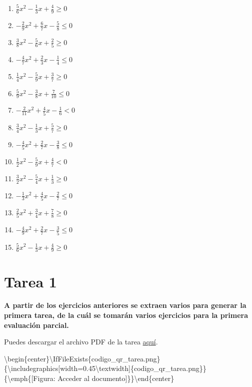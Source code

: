 \documentclass[12pt]{article}
\providecommand{\tightlist}{\setlength{\itemsep}{0pt}\setlength{\parskip}{0pt}}
\begin{document}
\begin{enumerate}
\def\labelenumi{\arabic{enumi}.}
\tightlist
\item
  \(\frac{5}{6}x^2 - \frac{1}{3}x + \frac{4}{9} \geq 0\)
\item
  \(-\frac{2}{9}x^2 + \frac{6}{7}x - \frac{5}{8} \leq 0\)
\item
  \(\frac{3}{8}x^2 - \frac{5}{6}x + \frac{2}{5} \geq 0\)
\item
  \(-\frac{4}{7}x^2 + \frac{2}{3}x - \frac{1}{4} \leq 0\)
\item
  \(\frac{1}{4}x^2 - \frac{5}{9}x + \frac{3}{7} \geq 0\)
\item
  \(\frac{5}{9}x^2 - \frac{3}{8}x + \frac{7}{10} \leq 0\)
\item
  \(-\frac{2}{11}x^2 + \frac{4}{5}x - \frac{1}{6} < 0\)
\item
  \(\frac{3}{4}x^2 - \frac{1}{3}x + \frac{5}{7} \geq 0\)
\item
  \(-\frac{4}{5}x^2 + \frac{2}{7}x - \frac{3}{8} \leq 0\)
\item
  \(\frac{1}{2}x^2 - \frac{5}{9}x + \frac{4}{7} < 0\)
\item
  \(\frac{3}{2}x^2 - \frac{5}{4}x + \frac{1}{3} \geq 0\)
\item
  \(-\frac{1}{3}x^2 + \frac{4}{5}x - \frac{2}{7} \leq 0\)
\item
  \(\frac{2}{5}x^2 + \frac{3}{4}x + \frac{7}{8} \geq 0\)
\item
  \(-\frac{4}{9}x^2 + \frac{2}{7}x - \frac{3}{5} \leq 0\)
\item
  \(\frac{5}{6}x^2 - \frac{1}{3}x + \frac{4}{9} \geq 0\)
\end{enumerate}

\section{Tarea 1}\label{tarea-1}

\textbf{A partir de los ejercicios anteriores se extraen varios para
generar la primera tarea, de la cuál se tomarán varios ejercicios para
la primera evaluación parcial.}

Puedes descargar el archivo PDF de la tarea
\href{https://github.com/ProfTodoMundo/NotasCalculoDiferencial/blob/PrincipalCD/docs/Tarea1.pdf}{aquí}.

\textbackslash begin\{center\}\textbackslash IfFileExists\{codigo\_qr\_tarea.png\}\{\textbackslash includegraphics{[}width=0.45\textbackslash textwidth{]}\{codigo\_qr\_tarea.png\}\}\{\textbackslash emph\{{[}Figura:
Acceder al documento{]}\}\}\textbackslash end\{center\}
\end{document}

